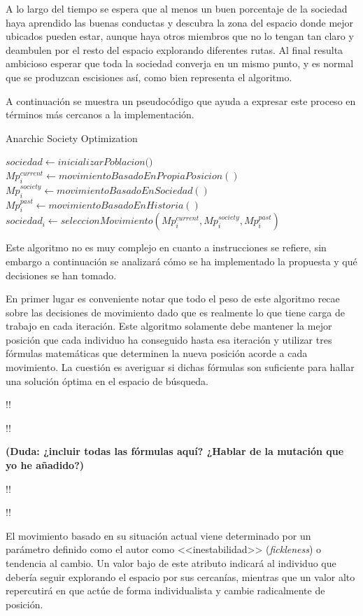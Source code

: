 A lo largo del tiempo se espera que al menos un buen porcentaje de la sociedad haya aprendido las buenas conductas y descubra la zona del espacio donde mejor ubicados pueden estar, aunque haya otros miembros que no lo tengan tan claro y deambulen por el resto del espacio explorando diferentes rutas. Al final resulta ambicioso esperar que toda la sociedad converja en un mismo punto, y es normal que se produzcan escisiones así, como bien representa el algoritmo.

A continuación se muestra un pseudocódigo que ayuda a expresar este proceso en términos más cercanos a la implementación.

\begin{algorithm}
	\caption{Anarchic Society Optimization}
	\begin{algorithmic}[1]
		\State $sociedad \gets \textit{inicializarPoblacion()}$
		\State $Mp^{current}_i \gets movimientoBasadoEnPropiaPosicion()$
		\State $Mp^{society}_i \gets movimientoBasadoEnSociedad()$
		\State $Mp^{past}_i \gets movimientoBasadoEnHistoria()$
		\State $sociedad_i \gets seleccionMovimiento(Mp^{current}_i, Mp^{society}_i, Mp^{past}_i)$
		\EndWhile
	\end{algorithmic}
\end{algorithm}

Este algoritmo no es muy complejo en cuanto a instrucciones se refiere, sin embargo a continuación se analizará cómo se ha implementado la propuesta y qué decisiones se han tomado.

En primer lugar es conveniente notar que todo el peso de este algoritmo recae sobre las decisiones de movimiento dado que es realmente lo que tiene carga de trabajo en cada iteración. Este algoritmo solamente debe mantener la mejor posición que cada individuo ha conseguido hasta esa iteración y utilizar tres fórmulas matemáticas que determinen la nueva posición acorde a cada movimiento. La cuestión es averiguar si dichas fórmulas son suficiente para hallar una solución óptima en el espacio de búsqueda.

!!

!!

\textbf{(Duda: ¿incluir todas las fórmulas aquí? ¿Hablar de la mutación que yo he añadido?)}

!!

!!

El movimiento basado en su situación actual viene determinado por un parámetro definido como el autor como <<inestabilidad>> (\textit{fickleness}) o tendencia al cambio. Un valor bajo de este atributo indicará al individuo que debería seguir explorando el espacio por sus cercanías, mientras que un valor alto repercutirá en que actúe de forma individualista y cambie radicalmente de posición.


